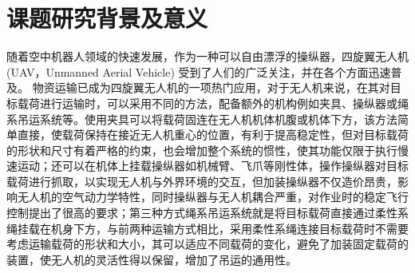\documentclass[lang=chs, degree=master, blindreview=false, winfonts=true]{yanputhesis}
\begin{document}
\section{课题研究背景及意义}
随着空中机器人领域的快速发展，作为一种可以自由漂浮的操纵器，四旋翼无人机(UAV，Unmanned Aerial Vehicle) 受到了人们的广泛关注，并在各个方面迅速普及\cite{kimon_advances_2023}。
物资运输已成为四旋翼无人机的一项热门应用\cite{cruz2014autonomous}，对于无人机来说，在其对目标载荷进行运输时，可以采用不同的方法，配备额外的机构例如夹具、操纵器或绳系吊运系统等。使用夹具可以将载荷固连在无人机机体机腹或机体下方，该方法简单直接，使载荷保持在接近无人机重心的位置，有利于提高稳定性，但对目标载荷的形状和尺寸有着严格的约束，也会增加整个系统的惯性，使其功能仅限于执行慢速运动\cite{Khalifa2017}；还可以在机体上挂载操纵器如机械臂、飞爪等刚性体，操作操纵器对目标载荷进行抓取，以实现无人机与外界环境的交互，但加装操纵器不仅造价昂贵，影响无人机的空气动力学特性，同时操纵器与无人机耦合严重，对作业时的稳定飞行控制提出了很高的要求；第三种方式绳系吊运系统就是将目标载荷直接通过柔性系绳挂载在机身下方，与前两种运输方式相比，采用柔性系绳连接目标载荷时不需要考虑运输载荷的形状和大小，其可以适应不同载荷的变化，避免了加装固定载荷的装置，使无人机的灵活性得以保留，增加了吊运的通用性。
\end{document}

